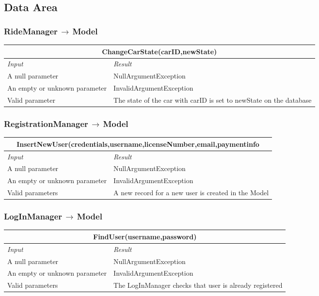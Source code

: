 \documentclass[11pt,a4paper]{report}
\begin{document}
\subsection{Data Area}
\subsubsection{RideManager$\,\to\,$Model}
\begin{tabularx}{\textwidth}{|X|X|}
	\hline
	\multicolumn{2}{|c|}{\textbf{ChangeCarState(carID,newState)}}\\
	\hline
	\textit{Input} & \textit{Result}\\
	\hline
	A null parameter & NullArgumentException\\
	\hline
	An empty or unknown parameter & InvalidArgumentException\\
	\hline
	Valid parameter & The state of the car with carID is set to newState on the database\\
	\hline
\end{tabularx}
\subsubsection{RegistrationManager$\,\to\,$Model}
\begin{tabularx}{\textwidth}{|X|X|}
	\hline
	\multicolumn{2}{|c|}{\textbf{InsertNewUser(credentials,username,licenseNumber,email,paymentinfo}}\\
	\hline
	\textit{Input} & \textit{Result}\\
	\hline
	A null parameter & NullArgumentException\\
	\hline
	An empty or unknown parameter & InvalidArgumentException\\
	\hline
	Valid parameters & A new record for a new user is created in the Model\\
	\hline
\end{tabularx}
\subsubsection{LogInManager$\,\to\,$Model}
\begin{tabularx}{\textwidth}{|X|X|}
	\hline
	\multicolumn{2}{|c|}{\textbf{FindUser(username,password)}}\\
	\hline
	\textit{Input} & \textit{Result}\\
	\hline
	A null parameter & NullArgumentException\\
	\hline
	An empty or unknown parameter & InvalidArgumentException\\
	\hline
	Valid parameters & The LogInManager checks that user is already registered\\
	\hline
\end{tabularx}
\end{document}
